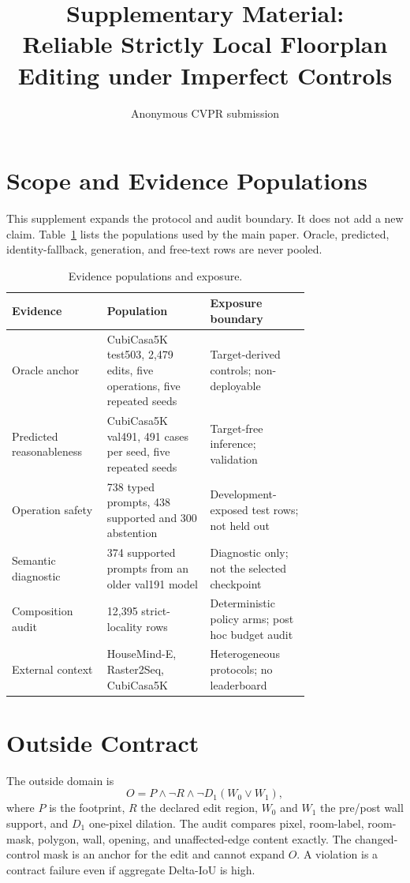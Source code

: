 \documentclass[10pt,twocolumn,letterpaper]{article}
\title{Supplementary Material:\\Reliable Strictly Local Floorplan Editing under Imperfect Controls}
\author{Anonymous CVPR submission}
\date{}
\begin{document}
\maketitle

\section{Scope and Evidence Populations}
This supplement expands the protocol and audit boundary. It does not add a new
claim. Table~\ref{tab:populations} lists the populations used by the main paper.
Oracle, predicted, identity-fallback, generation, and free-text rows are never
pooled.

\begin{table}[h]
\centering
\caption{Evidence populations and exposure.}
\label{tab:populations}
\footnotesize
\begin{tabular}{p{0.20\linewidth}p{0.28\linewidth}p{0.27\linewidth}}
\toprule
Evidence & Population & Exposure boundary \\
\midrule
Oracle anchor & CubiCasa5K test503, 2,479 edits, five operations, five repeated seeds & Target-derived controls; non-deployable \\
Predicted reasonableness & CubiCasa5K val491, 491 cases per seed, five repeated seeds & Target-free inference; validation \\
Operation safety & 738 typed prompts, 438 supported and 300 abstention & Development-exposed test rows; not held out \\
Semantic diagnostic & 374 supported prompts from an older val191 model & Diagnostic only; not the selected checkpoint \\
Composition audit & 12,395 strict-locality rows & Deterministic policy arms; post hoc budget audit \\
External context & HouseMind-E, Raster2Seq, CubiCasa5K & Heterogeneous protocols; no leaderboard \\
\bottomrule
\end{tabular}
\end{table}

\section{Outside Contract}
The outside domain is
\begin{equation}
O = P \land \neg R \land \neg D_1(W_0 \lor W_1),
\end{equation}
where $P$ is the footprint, $R$ the declared edit region, $W_0$ and $W_1$ the
pre/post wall support, and $D_1$ one-pixel dilation. The audit compares pixel,
room-label, room-mask, polygon, wall, opening, and unaffected-edge content
exactly. The changed-control mask is an anchor for the edit and cannot expand
$O$. A violation is a contract failure even if aggregate Delta-IoU is high.
\end{document}
